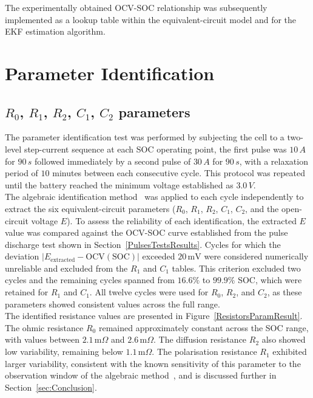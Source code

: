 The experimentally obtained \ac{OCV}-\ac{SOC} relationship was subsequently implemented as a lookup table within 
the equivalent-circuit model and for the \ac{EKF} estimation algorithm.

\section{Parameter Identification}
\subsection{$R_0$, $R_1$, $R_2$, $C_1$, $C_2$ parameters}
The parameter identification test was performed by subjecting the cell to a two-level step-current sequence at each \ac{SOC} operating point, the first pulse was $10\,A$ for 
$90\,s$ followed immediately by a second pulse of $30\,A$ for $90\,s$, with a relaxation period of $10$ minutes between each consecutive cycle. This protocol was 
repeated until the battery reached the minimum voltage established as $3.0\,V$.
\\
The algebraic identification method~\cite{DEVARAKONDA2014} was applied to each cycle independently to extract the six equivalent-circuit parameters 
($R_0$, $R_1$, $R_2$, $C_1$, $C_2$, and the open-circuit voltage $E$). To assess the 
reliability of each identification, the extracted $E$ value was compared against the \ac{OCV}-\ac{SOC} curve established from the pulse discharge test 
shown in Section~\ref{PulsesTestsResults}. Cycles for which the deviation $|E_{\text{extracted}} - \text{OCV}(\text{SOC})|$ exceeded $20\,\text{mV}$ were 
considered numerically unreliable and excluded from the $R_1$ and $C_1$ tables. 
This criterion excluded two cycles and the remaining cycles spanned from $16.6\%$ to $99.9\%$ \ac{SOC}, which were retained for $R_1$ and $C_1$. All twelve 
cycles were used for $R_0$, $R_2$, and $C_2$, as these parameters showed consistent values across the full range.
\\
The identified resistance values are presented in Figure~\ref{ResistorsParamResult}. 
The ohmic resistance $R_0$ remained approximately constant across the \ac{SOC} range, with values between $2.1\,\text{m}\Omega$ and $2.6\,\text{m}\Omega$. The diffusion 
resistance $R_2$ also showed low variability, remaining below $1.1\,\text{m}\Omega$. The polarisation resistance $R_1$ exhibited larger variability, 
consistent with the known sensitivity of this parameter to the observation window of the algebraic method~\cite{DEVARAKONDA2014}, and is discussed 
further in Section~\ref{sec:Conclusion}.

